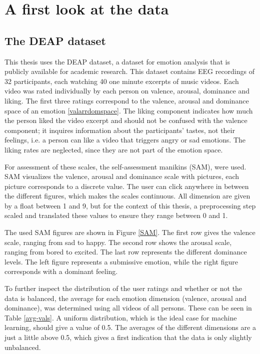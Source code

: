 \chapter{A first look at the data}
{\samenvatting }

\section{The DEAP dataset}
This thesis uses the DEAP dataset\cite{DEAP}, a dataset for emotion analysis that is publicly available for academic research. This dataset contains EEG recordings of 32 participants, each watching 40 one minute excerpts of music videos. Each video was rated individually by each person on valence, arousal, dominance and liking. The first three ratings correspond to the valence, arousal and dominance space of an emotion \ref{valarrdomspace}. The liking component indicates how much the person liked the video excerpt and should not be confused with the valence component; it inquires information about the participants' tastes, not their feelings, i.e. a person can like a video that triggers angry or sad emotions. The liking rates are neglected, since they are not part of the emotion space.

\npar

For assessment of these scales, the self-assessment manikins (SAM), were used\cite{DEAP}. SAM visualizes the valence, arousal and dominance scale with pictures, each picture corresponds to a discrete value. The user can click anywhere in between the different figures, which makes the scales continuous. All dimension are given by a float between 1 and 9, but for the context of this thesis, a preprocessing step scaled and translated these values to ensure they range between 0 and 1.

\npar

The used SAM figures are shown in Figure \ref{SAM}. The first row gives the valence scale, ranging from sad to happy. The second row shows the arousal scale, ranging from bored to excited. The last row represents the different dominance levels. The left figure represents a submissive emotion, while the right figure corresponds with a dominant feeling.


To further inspect the distribution of the user ratings and whether or not the data is balanced, the average for each emotion dimension (valence, arousal and dominance), was determined using all videos of all persons. These can be seen in Table \ref{avg-vals}. A uniform distribution, which is the ideal case for machine learning, should give a value of 0.5. The averages of the different dimensions are a just a little above 0.5, which gives a first indication that the data is only slightly unbalanced.

